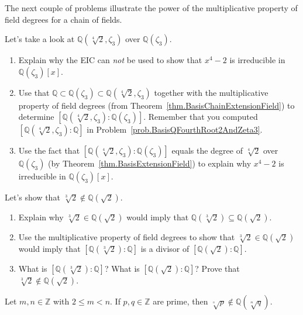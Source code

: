 The next couple of problems illustrate the power of the multiplicative property of field degrees for a chain of fields. 

\begin{problem}
Let's take a look at $\mathbb{Q}(\sqrt[4]{2},\zeta_3)$ over $\mathbb{Q}(\zeta_3)$.
\begin{enumerate}
\item Explain why the EIC can \emph{not} be used to show that $x^4-2$ is irreducible in $\mathbb{Q}(\zeta_3)[x]$.
\item Use  that $\mathbb{Q}\subset \mathbb{Q}(\zeta_3) \subset \mathbb{Q}(\sqrt[4]{2},\zeta_3)$  together with the multiplicative property of field degrees (from Theorem~\ref{thm.BasisChainExtensionField}) to determine  $[\mathbb{Q}(\sqrt[4]{2},\zeta_3):\mathbb{Q}(\zeta_3)]$. Remember that you computed $[\mathbb{Q}(\sqrt[4]{2},\zeta_3):\mathbb{Q}]$ in Problem~\ref{prob.BasisQFourthRoot2AndZeta3}.
\item Use the fact that $[\mathbb{Q}(\sqrt[4]{2},\zeta_3):\mathbb{Q}(\zeta_3)]$ equals the degree of $\sqrt[4]{2}$ over $\mathbb{Q}(\zeta_3)$ (by Theorem~\ref{thm.BasisExtensionField}) to explain why $x^4-2$ is irreducible in $\mathbb{Q}(\zeta_3)[x]$.
\end{enumerate}
\end{problem}

\begin{problem}
Let's show that $\sqrt[3]{2}\notin \mathbb{Q}(\sqrt{2})$.
\begin{enumerate}
\item Explain why $\sqrt[3]{2}\in \mathbb{Q}(\sqrt{2})$ would imply that $\mathbb{Q}(\sqrt[3]{2})\subseteq\mathbb{Q}(\sqrt{2})$.
\item Use the multiplicative property of field degrees to show that $\sqrt[3]{2}\in \mathbb{Q}(\sqrt{2})$ would imply that $[\mathbb{Q}(\sqrt[3]{2}):\mathbb{Q}]$ is a divisor of $[\mathbb{Q}(\sqrt{2}):\mathbb{Q}]$.
\item What is $[\mathbb{Q}(\sqrt[3]{2}):\mathbb{Q}]$? What is $[\mathbb{Q}(\sqrt{2}):\mathbb{Q}]$? Prove that $\sqrt[3]{2}\notin \mathbb{Q}(\sqrt{2})$.
\end{enumerate}
\end{problem}

\begin{theorem}
Let $m,n\in \mathbb{Z}$ with $2\le m<n$. If $p,q\in \mathbb{Z}$ are prime, then $\sqrt[\overset{n}{}]{p} \notin \mathbb{Q}(\sqrt[\overset{m}{}]{q})$.
\end{theorem}

